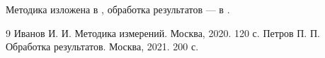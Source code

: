 Методика изложена в \cite{ivanov}, обработка результатов — в \cite{petrov}.

\begin{thebibliography}{9}
   Иванов И. И. Методика измерений. Москва, 2020. 120 с.
   Петров П. П. Обработка результатов. Москва, 2021. 200 с.
\end{thebibliography}
